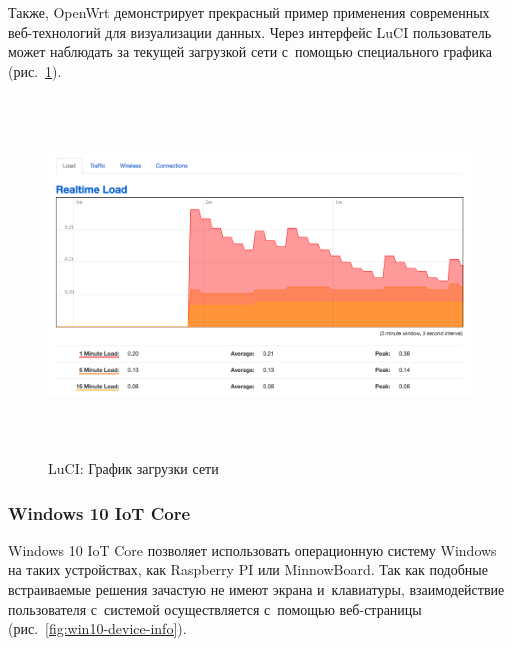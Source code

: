 Также, OpenWrt демонстрирует прекрасный пример применения современных веб-технологий для визуализации данных. Через интерфейс LuCI пользователь может наблюдать за текущей загрузкой сети с~помощью специального графика (рис.~\ref{fig:openwrt-load-graph}).

\begin{figure}[h!]
  \centering
  \includegraphics[height=9.5cm]{img/openwrt-load-graph}
  \vspace*{0pt}
  \caption{LuCI: График загрузки сети}\label{fig:openwrt-load-graph}
\end{figure}

\subsubsection{Windows 10 IoT Core}
\label{subsec:win10-review}

Windows 10 IoT Core позволяет использовать операционную систему Windows на таких устройствах, как Raspberry PI или MinnowBoard. Так как подобные встраиваемые решения зачастую не имеют экрана и~клавиатуры, взаимодействие пользователя с~системой осуществляется с~помощью веб-страницы (рис.~\ref{fig:win10-device-info}).


